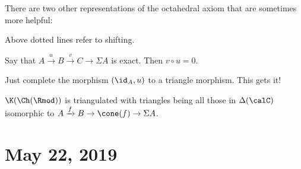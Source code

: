 \documentclass[12pt]{article}
\begin{document}
\begin{rmk}
There are two other representations of the octahedral axiom that are sometimes more helpful:
\begin{center}
\end{center}

\begin{center}
\end{center}

\begin{center}
\end{center}
Above dotted lines refer to shifting.
\end{rmk}
\begin{lem}
	Say that $A\xrightarrow{u}B\xrightarrow{v}C\to\Sigma A$ is exact. Then $v\circ u=0$.
\end{lem}
\begin{prf}
	Just complete the morphism $(\id_A,u)$ to a triangle morphism. This gets it!
\end{prf}
\begin{ex}
	$\K(\Ch(\Rmod))$ is triangulated with triangles being all those in $\Delta(\calC)$ isomorphic to $A\xrightarrow{f}B\to \cone(f)\to \Sigma A$.
\end{ex}

\section{May 22, 2019}
\end{document}
